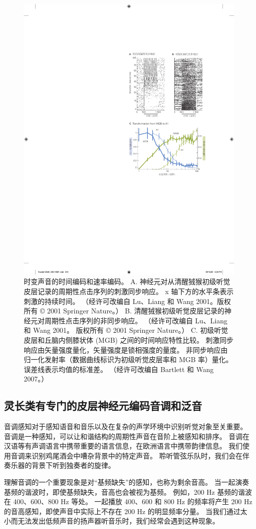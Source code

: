 \begin{figure}[htbp]
	\centering
	\includegraphics[width=0.5\linewidth]{chap28/fig_28_12}
	\caption{时变声音的时间编码和速率编码。
	A. 神经元对从清醒狨猴初级听觉皮层记录的周期性点击序列的刺激同步响应。 x 轴下方的水平条表示刺激的持续时间。 
	（经许可改编自 Lu、Liang 和 Wang 2001。版权所有 © 2001 Springer Nature。）
	B. 清醒狨猴初级听觉皮层记录的神经元对周期性点击序列的非同步响应。 
	（经许可改编自 Lu、Liang 和 Wang 2001。
	版权所有 © 2001 Springer Nature。） 
	C. 初级听觉皮层和丘脑内侧膝状体 (MGB) 之间的时间响应特性比较。 
	刺激同步响应由矢量强度量化，矢量强度是锁相强度的量度。 
	非同步响应由归一化发射率（数据曲线标识为初级听觉皮层率和 MGB 率）量化。 
	误差线表示均值的标准差。 （经许可改编自 Bartlett 和 Wang 2007。）}
	\label{fig:28_12}
\end{figure}


\subsection{灵长类有专门的皮层神经元编码音调和泛音}
音调感知对于感知语音和音乐以及在复杂的声学环境中识别听觉对象至关重要。 
音调是一种感知，可以让和谐结构的周期性声音在音阶上被感知和排序。 
音调在汉语等有声调语言中携带重要的语言信息，在欧洲语言中携带韵律信息。 
我们使用音调来识别鸡尾酒会中嘈杂背景中的特定声音。 
聆听管弦乐队时，我们会在伴奏乐器的背景下听到独奏者的旋律。

理解音调的一个重要现象是对“基频缺失”的感知，也称为剩余音高。 
当一起演奏基频的谐波时，即使基频缺失，音高也会被视为基频。 
例如，200 Hz 基频的谐波在 400、600、800 Hz 等处。 
一起播放 400、600 和 800 Hz 的频率将产生 200 Hz 的音高感知，即使声音中实际上不存在 200 Hz 的明显频率分量。 
当我们通过太小而无法发出低频声音的扬声器听音乐时，我们经常会遇到这种现象。


